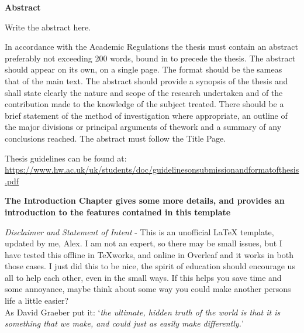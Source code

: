 \begin{center}
\LARGE\textbf {Abstract}
\end{center}
\vspace{1cm}

\begin{spacing}{1} 
\noindent
Write the abstract here.

In accordance with the Academic Regulations the thesis must contain an abstract preferably not exceeding 200 words, bound in to precede the thesis. The abstract should appear on its own, on a single page.  The format should be the sameas that of the main text. The abstract should provide a synopsis of the thesis and shall state clearly the nature and scope of the research undertaken and of the contribution made to the knowledge of the subject treated. There should be a brief statement of the method of investigation where appropriate, an outline of the major divisions or principal arguments of thework and a summary of any conclusions reached. The abstract must follow the Title Page.

Thesis guidelines can be found at: \\ \url{https://www.hw.ac.uk/uk/students/doc/guidelinesonsubmissionandformatofthesis.pdf }

\textbf{The Introduction Chapter gives some more details, and provides an introduction to the features contained in this template}

\textit{Disclaimer and Statement of Intent} - This is an unofficial LaTeX template, updated by me, Alex. I am not an expert, so there may be small issues, but I have tested this offline in TeXworks, and online in Overleaf and it works in both those cases. I just did this to be nice, the spirit of education should encourage us all to help each other, even in the small ways. If this helps you save time and some annoyance, maybe think about some way you could make another persons life a little easier? \\ As David Graeber put it: `\textit{the ultimate, hidden truth of the world is that it is something that we make, and could just as easily make differently.}'

\end{spacing}